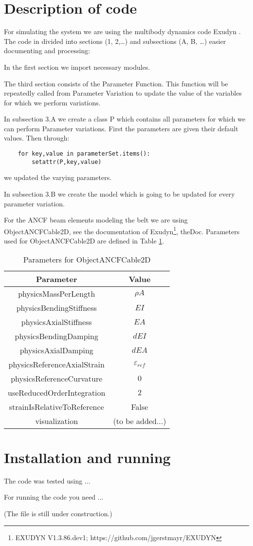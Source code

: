 \section{Description of code}
For simulating the system we are using the multibody dynamics code Exudyn \cite{Gerstmayr2022}.
%
The code in divided into sections (1, 2,…) and subsections (A, B, …) easier documenting and processing:
\bi 
\item{In the first section we import necessary modules.}
\item{The third section consists of the Parameter Function. This function will be repeatedly called from Parameter Variation to update the value of the variables for which we perform variations.} 
\item{In subsection 3.A we create a class P which contains all parameters for which we can perform Parameter variations. First the parameters are given their default values. Then through:
\pythonstyle
\begin{lstlisting}
	for key,value in parameterSet.items():
		setattr(P,key,value)
\end{lstlisting}		
we updated the varying parameters.}
\item{In subsection 3.B we create the model which is going to be updated for every parameter variation.}
 
%
For the ANCF beam elements modeling the belt we are using ObjectANCFCable2D, see the documentation of Exudyn\footnote{EXUDYN V1.3.86.dev1; https://github.com/jgerstmayr/EXUDYN}, theDoc.
Parameters used for ObjectANCFCable2D are defined in Table \ref{tab:ObjectANCFCable2D}.


\begin{table}
    \caption{Parameters for ObjectANCFCable2D} \label{tab:ObjectANCFCable2D}
    \centering
    \begin{tabular}{c|c} \hline
        Parameter & Value \\ \hline 
        physicsMassPerLength & $\rho A$\\
        physicsBendingStiffness & $EI$\\
        physicsAxialStiffness & $EA$\\
        physicsBendingDamping & $dEI$\\
        physicsAxialDamping & $dEA$\\
        physicsReferenceAxialStrain  & $\varepsilon_{ref}$\\
        physicsReferenceCurvature & $0$\\
        useReducedOrderIntegration & $2$\\
        strainIsRelativeToReference & False\\
        visualization & (to be added...)\\ \hline
    \end{tabular}
\end{table}
\ei

\section{Installation and running}
The code was tested using ... 

For running the code you need ...

(The file is still under construction.)